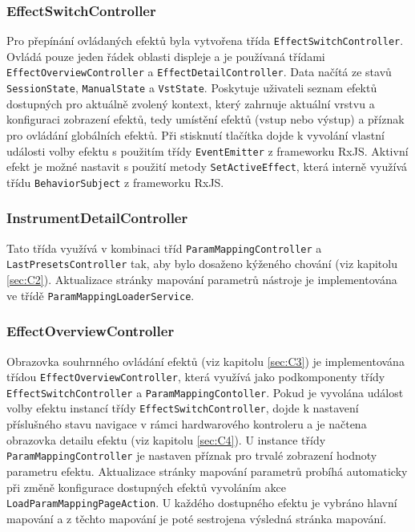 \documentclass[thesis=M,czech]{FITthesis}[2019/03/06]
\begin{document}
			\subsubsection{EffectSwitchController}
				Pro přepínání ovládaných efektů byla vytvořena třída \texttt{Effect\-Switch\-Controller}. 
				Ovládá pouze jeden řádek oblasti displeje a je používaná třídami \texttt{Effect\-Overview\-Controller} a \texttt{Effect\-Detail\-Controller}. Data načítá ze stavů \texttt{SessionState}, \texttt{ManualState} a \texttt{VstState}.
				Poskytuje uživateli seznam efektů dostupných pro aktuálně zvolený kontext, který zahrnuje aktuální vrstvu a konfiguraci
				zobrazení efektů, tedy umístění efektů (vstup nebo výstup) a příznak pro ovládání globálních efektů.
				Při stisknutí tlačítka dojde k vyvolání vlastní události volby efektu s použitím třídy \texttt{EventEmitter} z frameworku RxJS. Aktivní efekt je možné nastavit s použití metody \texttt{Set\-Active\-Effect}, která interně využívá
				třídu \texttt{BehaviorSubject} z frameworku RxJS.			
							
			\subsubsection{InstrumentDetailController}
				Tato třída využívá v kombinaci tříd \texttt{Param\-Mapping\-Controller} a \texttt{Last\-Presets\-Controller} tak, aby bylo dosaženo kýženého chování (viz kapitolu \ref{sec:C2}).
				Aktualizace stránky mapování parametrů nástroje je implementována ve třídě \texttt{Param\-Mapping\-Loader\-Service}.
				
			\subsubsection{EffectOverviewController}
				Obrazovka souhrnného ovládání efektů (viz kapitolu \ref{sec:C3}) je implementována třídou \texttt{Effect\-Overview\-Controller},
				která využívá jako podkomponenty třídy \texttt{Effect\-Switch\-Controller} a \texttt{Param\-Mapping\-Contoller}.
				Pokud je vyvolána událost volby efektu instancí třídy \texttt{Effect\-Switch\-Controller}, dojde k nastavení příslušného stavu navigace v rámci hardwarového kontroleru a je načtena obrazovka detailu efektu (viz kapitolu \ref{sec:C4}).
				U instance třídy \texttt{Param\-Mapping\-Controller} je nastaven příznak pro trvalé zobrazení hodnoty parametru efektu.
				Aktualizace stránky mapování parametrů probíhá automaticky při změně konfigurace dostupných efektů vyvoláním akce \texttt{Load\-Param\-Mapping\-Page\-Action}. U každého dostupného efektu je vybráno hlavní mapování a z těchto mapování
				je poté sestrojena výsledná stránka mapování. 			
				
\end{document}
